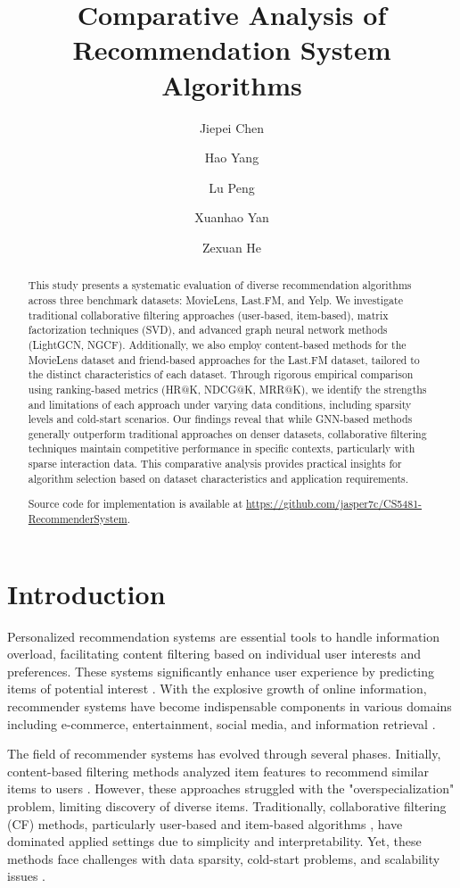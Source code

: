 \documentclass[sigconf,nonacm]{acmart} %
\title{Comparative Analysis of Recommendation System Algorithms}
\author{Jiepei Chen}
\affiliation{
  \institution{City University of HongKong (Dongguan)}
}
\author{Hao Yang}
\affiliation{
  \institution{City University of HongKong (Dongguan)}
}
\author{Lu Peng}
\affiliation{
  \institution{City University of HongKong (Dongguan)}
}
\author{Xuanhao Yan}
\affiliation{
  \institution{City University of HongKong (Dongguan)}
}
\author{Zexuan He}
\affiliation{
  \institution{City University of HongKong (Dongguan)}
}
\begin{document}
\fancyhead{} %

\begin{abstract}

This study presents a systematic evaluation of diverse recommendation algorithms across three benchmark datasets: MovieLens, Last.FM, and Yelp. We investigate traditional collaborative filtering approaches (user-based, item-based), matrix factorization techniques (SVD), and advanced graph neural network methods (LightGCN, NGCF). Additionally, we also employ content-based methods for the MovieLens dataset and friend-based approaches for the Last.FM dataset, tailored to the distinct characteristics of each dataset. Through rigorous empirical comparison using ranking-based metrics (HR@K, NDCG@K, MRR@K), we identify the strengths and limitations of each approach under varying data conditions, including sparsity levels and cold-start scenarios. Our findings reveal that while GNN-based methods generally outperform traditional approaches on denser datasets, collaborative filtering techniques maintain competitive performance in specific contexts, particularly with sparse interaction data. This comparative analysis provides practical insights for algorithm selection based on dataset characteristics and application requirements.  

Source code for implementation is available at \url{https://github.com/jasper7c/CS5481-RecommenderSystem}. 
\end{abstract}

\maketitle

\section{Introduction}
Personalized recommendation systems are essential tools to handle information overload, facilitating content filtering based on individual user interests and preferences. These systems significantly enhance user experience by predicting items of potential interest \cite{ricci2011introduction}. With the explosive growth of online information, recommender systems have become indispensable components in various domains including e-commerce, entertainment, social media, and information retrieval \cite{adomavicius2005toward}.

The field of recommender systems has evolved through several phases. Initially, content-based filtering methods analyzed item features to recommend similar items to users \cite{pazzani2007content}. However, these approaches struggled with the "overspecialization" problem, limiting discovery of diverse items. Traditionally, collaborative filtering (CF) methods, particularly user-based and item-based algorithms \cite{sarwar2001item}, have dominated applied settings due to simplicity and interpretability. Yet, these methods face challenges with data sparsity, cold-start problems, and scalability issues \cite{su2009survey}.
\end{document}
